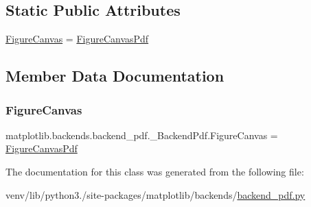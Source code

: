 \subsection*{Static Public Attributes}
\begin{DoxyCompactItemize}
\item 
\hyperlink{classmatplotlib_1_1backends_1_1backend__pdf_1_1__BackendPdf_aa4be25c3f616eeead73b07d6146c180b}{Figure\+Canvas} = \hyperlink{classmatplotlib_1_1backends_1_1backend__pdf_1_1FigureCanvasPdf}{Figure\+Canvas\+Pdf}
\end{DoxyCompactItemize}


\subsection{Member Data Documentation}
\mbox{\label{classmatplotlib_1_1backends_1_1backend__pdf_1_1__BackendPdf_aa4be25c3f616eeead73b07d6146c180b}} 
\subsubsection{\texorpdfstring{Figure\+Canvas}{FigureCanvas}}
{\footnotesize\ttfamily matplotlib.\+backends.\+backend\+\_\+pdf.\+\_\+\+Backend\+Pdf.\+Figure\+Canvas = \hyperlink{classmatplotlib_1_1backends_1_1backend__pdf_1_1FigureCanvasPdf}{Figure\+Canvas\+Pdf}\hspace{0.3cm}{\ttfamily [static]}}



The documentation for this class was generated from the following file\+:\begin{DoxyCompactItemize}
\item 
venv/lib/python3./site-\/packages/matplotlib/backends/\hyperlink{backend__pdf_8py}{backend\+\_\+pdf.\+py}\end{DoxyCompactItemize}
